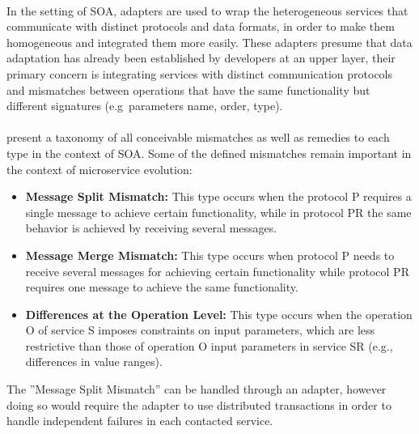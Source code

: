 \paragraph{}

In the setting of SOA, adapters are used to wrap the heterogeneous services that communicate with distinct protocols and data formats,
in order to make them homogeneous and integrated them more easily.
These adapters presume that data adaptation has already been established by developers at an upper layer,
their primary concern is integrating services with distinct communication protocols and mismatches between operations that have the
same functionality but different signatures (e.g\ parameters name, order, type).

\paragraph{}

\citeauthor{adaptersWebServices} \cite{adaptersWebServices} present a taxonomy of all conceivable mismatches as well as remedies to each type in the context of SOA.
Some of the defined mismatches remain important in the context of microservice evolution:

\begin{itemize}
    \item \textbf{Message Split Mismatch:} This type occurs when the protocol P requires a single message to achieve certain functionality,
    while in protocol PR the same behavior is achieved by receiving several messages.
    \item \textbf{Message Merge Mismatch:} This type occurs when protocol P needs to receive several messages for achieving certain
    functionality while protocol PR requires one message to achieve the same functionality.
    \item \textbf{Differences at the Operation Level:} This type occurs when the operation O of service S imposes constraints on input parameters,
    which are less restrictive than those of operation O input parameters in service SR (e.g., differences in value ranges).
\end{itemize}

The ''Message Split Mismatch'' can be handled through an adapter, however doing so
would require the adapter to use distributed transactions in order to handle independent failures in each contacted service.

\paragraph{}


